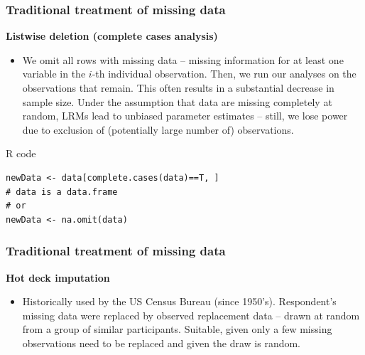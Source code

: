 \documentclass{beamer}
\begin{document}
\begin{frame}[fragile] %
\frametitle{Traditional treatment of missing data}


\textbf{Listwise deletion (complete cases analysis)}
\vspace{0.2cm}
  \begin{itemize}
  \item  We omit all rows with missing data – missing information for at least one variable in the $i$-th individual observation. Then, we run our analyses on the observations that remain. This often results in a substantial decrease in sample size. Under the assumption that data are missing completely at random, LRMs lead to unbiased parameter estimates – still, we lose power due to exclusion of (potentially large number of) observations.
  \end{itemize} 

\begin{block}{R code}
\begin{verbatim}
newData <- data[complete.cases(data)==T, ] 
# data is a data.frame
# or
newData <- na.omit(data) 
\end{verbatim}
\end{block}

\end{frame}


\begin{frame}
\frametitle{Traditional treatment of missing data}


\textbf{Hot deck imputation}
\vspace{0.2cm}
  \begin{itemize}
  \item  Historically used by the US Census Bureau (since 1950’s). Respondent’s missing data were replaced by observed replacement data – drawn at random from a group of similar participants. Suitable, given only a few missing observations need to be replaced and given the draw is random.
  \end{itemize} 

\end{frame}


\end{document}
